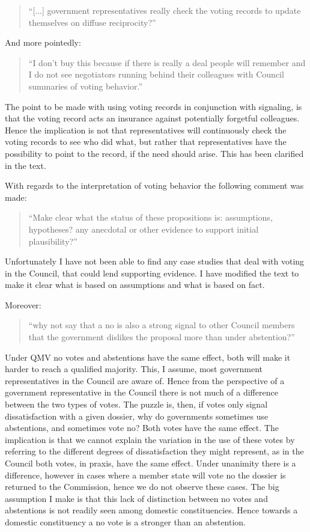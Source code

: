 \documentclass{article}
\begin{document}
\begin{quote}
  ``[...] government representatives really check the voting records to update themselves on diffuse reciprocity?''
\end{quote}

And more pointedly:

\begin{quote}
  ``I don't buy this because if there is really a deal people will remember and I do not see negotiators running behind their colleagues with Council summaries of voting behavior.''
\end{quote}

The point to be made with using voting records in conjunction with signaling, is that the voting record acts an insurance against potentially forgetful colleagues. Hence the implication is not that representatives will continuously check the voting records to see who did what, but rather that representatives have the possibility to point to the record, if the need should arise. This has been clarified in the text. 

With regards to the interpretation of voting behavior the following comment was made:

\begin{quote}
  ``Make clear what the status of these propositions is: assumptions, hypotheses? any anecdotal or other evidence to support initial plausibility?''
\end{quote}

Unfortunately I have not been able to find any case studies that deal with voting in the Council, that could lend supporting evidence. I have modified the text to make it clear what is based on assumptions and what is based on fact. 

Moreover:

\begin{quote}
  ``why not say that a no is also a strong signal to other Council members that the government dislikes the proposal more than under abstention?''
\end{quote}

Under QMV no votes and abstentions have the same effect, both will make it harder to reach a qualified majority. This, I assume, most government representatives in the Council are aware of. Hence from the perspective of a government representative in the Council there is not much of a difference between the two types of votes. The puzzle is, then, if votes only signal dissatisfaction with a given dossier, why do governments sometimes use abstentions, and sometimes vote no? Both votes have the same effect. The implication is that we cannot explain the variation in the use of these votes by referring to the different degrees of dissatisfaction they might represent, as in the Council both votes, in praxis, have the same effect. Under unanimity there is a difference, however in cases where a member state will vote no the dossier is returned to the Commission, hence we do not observe these cases. The big assumption I make is that this lack of distinction between no votes and abstentions is not readily seen among domestic constituencies. Hence towards a domestic constituency a no vote is a stronger than an abstention. 
\end{document}
